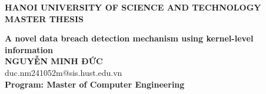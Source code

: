 \documentclass[DoAn.tex]{subfiles}
\begin{document}
\begin{titlepage}
  \thispagestyle{empty}
  \begin{center}

    {\textbf{\large{HANOI UNIVERSITY OF SCIENCE AND TECHNOLOGY}}}\\[4cm]

    {\textbf{\huge{MASTER THESIS}}}\\[1cm]
    {\textbf{\Large{A novel data breach detection mechanism using
      kernel-level information}}\\[1cm]

      {\textbf{\large{NGUYỄN MINH ĐỨC}}}\\
      {\large{duc.nm241052m@sis.hust.edu.vn}}\\[0.5cm]

      {\textbf{\large{Program: Master of Computer Engineering
      }}}\\

      \vspace{4cm}
      \begin{table}[H]
        \centering
    \end{table}}
  \end{center}

\end{titlepage}
\end{document}
